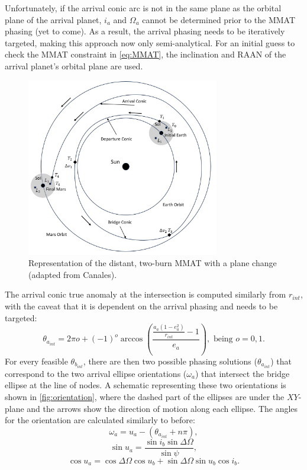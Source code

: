 Unfortunately, if the arrival conic arc is not in the same plane as the orbital plane of the
arrival planet, $i_{a}$ and $\Omega_{a}$ cannot be determined prior to the MMAT phasing (yet to
come). As a result, the arrival phasing needs to be iteratively targeted, making this approach now
only semi-analytical. For an initial guess to check the MMAT constraint in \cref{eq:MMAT}, the
inclination and RAAN of the arrival planet's orbital plane are used.

\begin{figure}[ht]
    \centering
    \includegraphics[width=0.75\textwidth]{figures/MMAT.jpg}
    \caption{Representation of the distant, two-burn MMAT with a plane change (adapted from Canales\cite{Canales:2021b}).}
    \label{fig:MMAT}
\end{figure}

The arrival conic true anomaly at the intersection is computed similarly from $r_{int}$, with the
caveat that it is dependent on the arrival phasing and needs to be targeted:
\begin{equation}
    \theta_{a_{int}}=2\pi o+(-1)^{o}\arccos(\frac{\frac{a_{a}(1-e_{a}^{2})}{r_{int}}-1}{e_{a}}),\text{ being }o=0,1.
    \label{eq:arrivalintersect}
\end{equation}
For every feasible $\theta_{b_{int}}$, there are then two possible phasing solutions
($\theta_{a_{int}}$) that correspond to the two arrival ellipse orientations ($\omega_{a}$) that
intersect the bridge ellipse at the line of nodes. A schematic representing these two orientations
is shown in \cref{fig:orientation}, where the dashed part of the ellipses are under the $XY$-plane
and the arrows show the direction of motion along each ellipse. The angles for the orientation are
calculated similarly to before:
\begin{equation}
    \omega_{a}=u_{a}-(\theta_{a_{int}}+n\pi),
    \label{eq:arrivalperiapse}
\end{equation}
\begin{equation}
    \sin u_{a}=\frac{\sin i_{b}\sin\Delta\Omega}{\sin\psi},
    \label{eq:arrivalsinu}
\end{equation}
\begin{equation}
    \cos u_{a}=\cos\Delta\Omega\cos u_{b}+\sin\Delta\Omega\sin u_{b}\cos i_{b}.
    \label{eq:arrivalcosu}
\end{equation}

